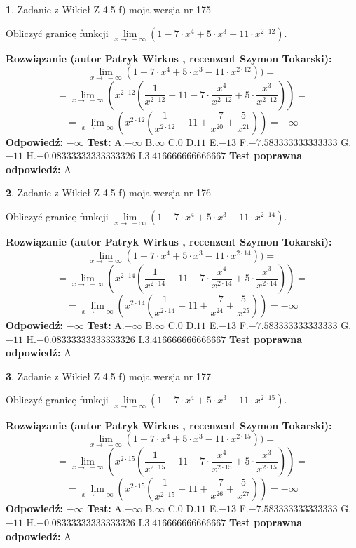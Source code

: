 \documentclass[12pt, a4paper]{article}
\theoremstyle{definition} %
\newtheorem{zad}{}
\newcommand{\zadStart}[1]{\begin{zad}#1\newline}
\newcommand{\zadStop}{\end{zad}}
\newcommand{\rozwStart}[2]{\noindent \textbf{Rozwiązanie (autor #1 , recenzent #2): }\newline}
\newcommand{\rozwStop}{\newline}
\newcommand{\odpStart}{\noindent \textbf{Odpowiedź:}\newline}
\newcommand{\odpStop}{\newline}
\newcommand{\testStart}{\noindent \textbf{Test:}\newline}
\newcommand{\testStop}{\newline}
\newcommand{\kluczStart}{\noindent \textbf{Test poprawna odpowiedź:}\newline}
\newcommand{\kluczStop}{\newline}
\begin{document}
\zadStart{Zadanie z Wikieł Z 4.5 f) moja wersja nr 175}


Obliczyć granicę funkcji  $\lim\limits_{x\to\ -\infty}(1 - 7 \cdot x^{4}+5 \cdot x^{3}- 11 \cdot x^{2\cdot12})$.
\zadStop
\rozwStart{Patryk Wirkus}{Szymon Tokarski}
$$\lim\limits_{x\to\ -\infty}(1 - 7 \cdot x^{4}+5 \cdot x^{3}- 11 \cdot x^{2\cdot12}))=$$
$$=\lim\limits_{x\to\ -\infty}(x^{2\cdot12}(\frac{1}{x^{2\cdot12}}-11 -7 \cdot \frac{x^{4}}{x^{2\cdot12}}+5 \cdot \frac{x^{3}}{x^{2\cdot12}}))=$$
$$=\lim\limits_{x\to\ -\infty}(x^{2\cdot12}(\frac{1}{x^{2\cdot12}}-11 + \frac{-7}{x^{20}}+ \frac{5}{x^{21}}))=-\infty$$
\rozwStop
\odpStart
$-\infty$
\odpStop
\testStart
A.$-\infty$ B.$\infty$ C.$0$ D.$11$ E.$-13$
F.$-7.583333333333333$ G.$-11$
H.$-0.08333333333333326$
I.$3.416666666666667$
\testStop
\kluczStart
A
\kluczStop



\zadStart{Zadanie z Wikieł Z 4.5 f) moja wersja nr 176}


Obliczyć granicę funkcji  $\lim\limits_{x\to\ -\infty}(1 - 7 \cdot x^{4}+5 \cdot x^{3}- 11 \cdot x^{2\cdot14})$.
\zadStop
\rozwStart{Patryk Wirkus}{Szymon Tokarski}
$$\lim\limits_{x\to\ -\infty}(1 - 7 \cdot x^{4}+5 \cdot x^{3}- 11 \cdot x^{2\cdot14}))=$$
$$=\lim\limits_{x\to\ -\infty}(x^{2\cdot14}(\frac{1}{x^{2\cdot14}}-11 -7 \cdot \frac{x^{4}}{x^{2\cdot14}}+5 \cdot \frac{x^{3}}{x^{2\cdot14}}))=$$
$$=\lim\limits_{x\to\ -\infty}(x^{2\cdot14}(\frac{1}{x^{2\cdot14}}-11 + \frac{-7}{x^{24}}+ \frac{5}{x^{25}}))=-\infty$$
\rozwStop
\odpStart
$-\infty$
\odpStop
\testStart
A.$-\infty$ B.$\infty$ C.$0$ D.$11$ E.$-13$
F.$-7.583333333333333$ G.$-11$
H.$-0.08333333333333326$
I.$3.416666666666667$
\testStop
\kluczStart
A
\kluczStop



\zadStart{Zadanie z Wikieł Z 4.5 f) moja wersja nr 177}


Obliczyć granicę funkcji  $\lim\limits_{x\to\ -\infty}(1 - 7 \cdot x^{4}+5 \cdot x^{3}- 11 \cdot x^{2\cdot15})$.
\zadStop
\rozwStart{Patryk Wirkus}{Szymon Tokarski}
$$\lim\limits_{x\to\ -\infty}(1 - 7 \cdot x^{4}+5 \cdot x^{3}- 11 \cdot x^{2\cdot15}))=$$
$$=\lim\limits_{x\to\ -\infty}(x^{2\cdot15}(\frac{1}{x^{2\cdot15}}-11 -7 \cdot \frac{x^{4}}{x^{2\cdot15}}+5 \cdot \frac{x^{3}}{x^{2\cdot15}}))=$$
$$=\lim\limits_{x\to\ -\infty}(x^{2\cdot15}(\frac{1}{x^{2\cdot15}}-11 + \frac{-7}{x^{26}}+ \frac{5}{x^{27}}))=-\infty$$
\rozwStop
\odpStart
$-\infty$
\odpStop
\testStart
A.$-\infty$ B.$\infty$ C.$0$ D.$11$ E.$-13$
F.$-7.583333333333333$ G.$-11$
H.$-0.08333333333333326$
I.$3.416666666666667$
\testStop
\kluczStart
A
\kluczStop
\end{document}
